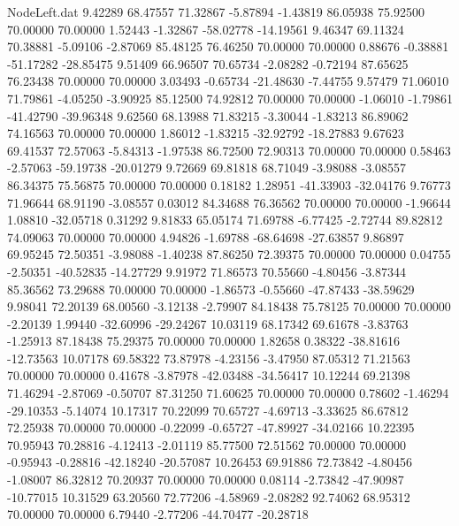 \begin{filecontents}{NodeLeft.dat}
   9.42289   68.47557   71.32867    -5.87894   -1.43819   86.05938   75.92500   70.00000   70.00000    1.52443   -1.32867  -58.02778  -14.19561
   9.46347   69.11324   70.38881    -5.09106   -2.87069   85.48125   76.46250   70.00000   70.00000    0.88676   -0.38881  -51.17282  -28.85475
   9.51409   66.96507   70.65734    -2.08282   -0.72194   87.65625   76.23438   70.00000   70.00000    3.03493   -0.65734  -21.48630   -7.44755
   9.57479   71.06010   71.79861    -4.05250   -3.90925   85.12500   74.92812   70.00000   70.00000   -1.06010   -1.79861  -41.42790  -39.96348
   9.62560   68.13988   71.83215    -3.30044   -1.83213   86.89062   74.16563   70.00000   70.00000    1.86012   -1.83215  -32.92792  -18.27883
   9.67623   69.41537   72.57063    -5.84313   -1.97538   86.72500   72.90313   70.00000   70.00000    0.58463   -2.57063  -59.19738  -20.01279
   9.72669   69.81818   68.71049    -3.98088   -3.08557   86.34375   75.56875   70.00000   70.00000    0.18182    1.28951  -41.33903  -32.04176
   9.76773   71.96644   68.91190    -3.08557    0.03012   84.34688   76.36562   70.00000   70.00000   -1.96644    1.08810  -32.05718    0.31292
   9.81833   65.05174   71.69788    -6.77425   -2.72744   89.82812   74.09063   70.00000   70.00000    4.94826   -1.69788  -68.64698  -27.63857
   9.86897   69.95245   72.50351    -3.98088   -1.40238   87.86250   72.39375   70.00000   70.00000    0.04755   -2.50351  -40.52835  -14.27729
   9.91972   71.86573   70.55660    -4.80456   -3.87344   85.36562   73.29688   70.00000   70.00000   -1.86573   -0.55660  -47.87433  -38.59629
   9.98041   72.20139   68.00560    -3.12138   -2.79907   84.18438   75.78125   70.00000   70.00000   -2.20139    1.99440  -32.60996  -29.24267
  10.03119   68.17342   69.61678    -3.83763   -1.25913   87.18438   75.29375   70.00000   70.00000    1.82658    0.38322  -38.81616  -12.73563
  10.07178   69.58322   73.87978    -4.23156   -3.47950   87.05312   71.21563   70.00000   70.00000    0.41678   -3.87978  -42.03488  -34.56417
  10.12244   69.21398   71.46294    -2.87069   -0.50707   87.31250   71.60625   70.00000   70.00000    0.78602   -1.46294  -29.10353   -5.14074
  10.17317   70.22099   70.65727    -4.69713   -3.33625   86.67812   72.25938   70.00000   70.00000   -0.22099   -0.65727  -47.89927  -34.02166
  10.22395   70.95943   70.28816    -4.12413   -2.01119   85.77500   72.51562   70.00000   70.00000   -0.95943   -0.28816  -42.18240  -20.57087
  10.26453   69.91886   72.73842    -4.80456   -1.08007   86.32812   70.20937   70.00000   70.00000    0.08114   -2.73842  -47.90987  -10.77015
  10.31529   63.20560   72.77206    -4.58969   -2.08282   92.74062   68.95312   70.00000   70.00000    6.79440   -2.77206  -44.70477  -20.28718

\end{filecontents}
